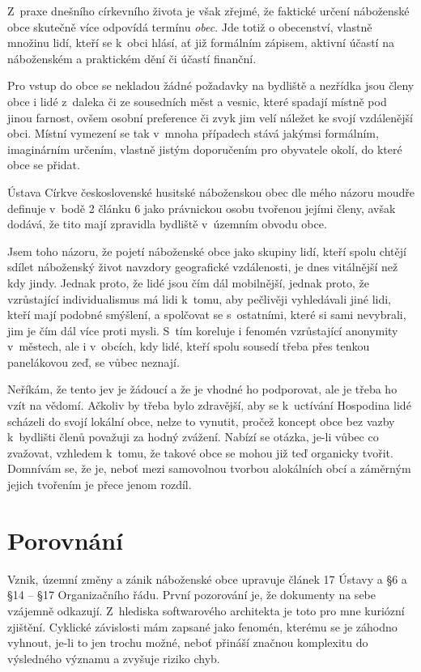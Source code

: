 Z~praxe dnešního církevního života je však zřejmé, že faktické určení náboženské
obce skutečně více odpovídá termínu \textit{obec}. Jde totiž o obecenství,
vlastně množinu lidí, kteří se k~obci hlásí, ať již formálním zápisem, aktivní
účastí na náboženském a praktickém dění či účastí finanční.

Pro vstup do obce se nekladou žádné požadavky na bydliště a nezřídka jsou členy
obce i lidé z~daleka či ze sousedních měst a vesnic, které spadají místně pod
jinou farnost, ovšem osobní preference či zvyk jim velí náležet ke svojí
vzdálenější obci. Místní vymezení se tak v~mnoha případech stává jakýmsi
formálním, imaginárním určením, vlastně jistým doporučením pro obyvatele okolí,
do které obce se přidat.

Ústava Církve československé husitské náboženskou obec dle mého názoru moudře definuje v~bodě 2
článku 6 jako právnickou osobu tvořenou jejími členy, avšak dodává, že tito mají
zpravidla bydliště v~územním obvodu obce.

Jsem toho názoru, že pojetí náboženské obce jako skupiny lidí, kteří spolu
chtějí sdílet náboženský život navzdory geografické vzdálenosti, je dnes
vitálnější než kdy jindy. Jednak proto, že lidé jsou čím dál mobilnější, jednak
proto, že vzrůstající individualismus má lidi k~tomu, aby pečlivěji vyhledávali
jiné lidi, kteří mají podobné smýšlení, a spolčovat se s~ostatními, které si
sami nevybrali, jim je čím dál více proti mysli. S~tím koreluje i fenomén
vzrůstající anonymity v~městech, ale i v~obcích, kdy lidé, kteří spolu sousedí
třeba přes tenkou panelákovou zeď, se vůbec neznají.

Neříkám, že tento jev je žádoucí a že je vhodné ho podporovat, ale je třeba ho
vzít na vědomí. Ačkoliv by třeba bylo zdravější, aby se k~uctívání Hospodina
lidé scházeli do svojí lokální obce, nelze to vynutit, pročež koncept obce
bez vazby k~bydlišti členů považuji za hodný zvážení. Nabízí se otázka, je-li
vůbec co zvažovat, vzhledem k~tomu, že takové obce se mohou již teď organicky
tvořit. Domnívám se, že je, neboť mezi samovolnou tvorbou alokálních obcí a
záměrným jejich tvořením je přece jenom rozdíl.

\chapter{Porovnání}

Vznik, územní změny a zánik náboženské obce upravuje článek 17 Ústavy a §6 a §14
-- §17 Organizačního řádu. První pozorování je, že dokumenty na sebe vzájemně
odkazují. Z~hlediska softwarového architekta je toto pro mne kuriózní zjištění.
Cyklické závislosti mám zapsané jako fenomén, kterému se je záhodno vyhnout,
je-li to jen trochu možné, neboť přináší značnou komplexitu do výsledného
významu a zvyšuje riziko chyb.


